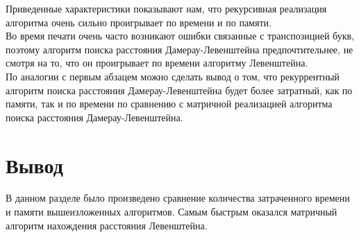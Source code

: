Приведенные характеристики показывают нам, что рекурсивная реализация алгоритма очень сильно проигрывает по времени и по памяти.\\
Во время печати очень часто возникают ошибки связанные с транспозицией букв, поэтому алгоритм поиска расстояния Дамерау-Левенштейна предпочтительнее, не смотря на то, что он проигрывает по времени алгоритму Левенштейна.\\
По аналогии с первым абзацем можно сделать вывод о том, что рекуррентный алгоритм поиска расстояния Дамерау-Левенштейна будет более затратный, как по памяти, так и по времени по сравнению с матричной реализацией алгоритма поиска расстояния Дамерау-Левенштейна.

\section{Вывод}

В данном разделе было произведено сравнение количества затраченного времени и памяти вышеизложенных алгоритмов.
Самым быстрым оказался матричный алгоритм нахождения расстояния Левенштейна.


